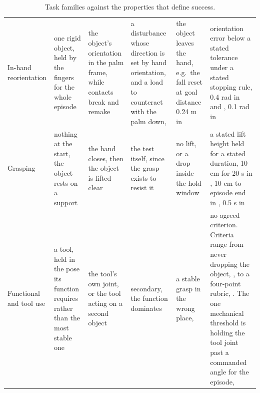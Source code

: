 \begin{table}[!t]
  \caption{Task families against the properties that define success.}
  \label{tab:tasks}
  \centering\scriptsize
  \begin{tabular}{@{}L{0.085\textwidth}L{0.150\textwidth}L{0.150\textwidth}L{0.145\textwidth}L{0.130\textwidth}L{0.240\textwidth}@{}}
    \toprule
      &  &  &  &  &  \\
    \midrule
    In-hand reorientation &
    one rigid object, held by the fingers for the whole episode &
    the object's orientation in the palm frame, while contacts break and remake &
    a disturbance whose direction is set by hand orientation, and a load to counteract with the palm down, \cite{visual_dexterity_2022} &
    the object leaves the hand, e.g.\ the fall reset at goal distance 0.24 m in \cite{dextreme_2022} &
    orientation error below a stated tolerance under a stated stopping rule, 0.4 rad in \cite{openai_dexterity_2018} and \cite{dextreme_2022}, 0.1 rad in \cite{eureka_2023} \\
    \addlinespace[2.5pt]
    Grasping &
    nothing at the start, the object rests on a support &
    the hand closes, then the object is lifted clear &
    the test itself, since the grasp exists to resist it &
    no lift, or a drop inside the hold window &
    a stated lift height held for a stated duration, 10 cm for 20 s in \cite{dexgraspvla_2025}, 10 cm to episode end in \cite{graspxl_2024}, 0.5 s in \cite{omnigrasp_2024} \\
    \addlinespace[2.5pt]
    Functional and tool use &
    a tool, held in the pose its function requires rather than the most stable one &
    the tool's own joint, or the tool acting on a second object &
    secondary, the function dominates &
    a stable grasp in the wrong place, \cite{dexterous_functional_grasping_2023} &
    no agreed criterion. Criteria range from never dropping the object, \cite{dexterous_functional_grasping_2023}, to a four-point rubric, \cite{dexvla_2025}. The one mechanical threshold is holding the tool joint past a commanded angle for the episode, \cite{articulated_tools_inhand_2025} \\

\end{tabular}
\end{table}
